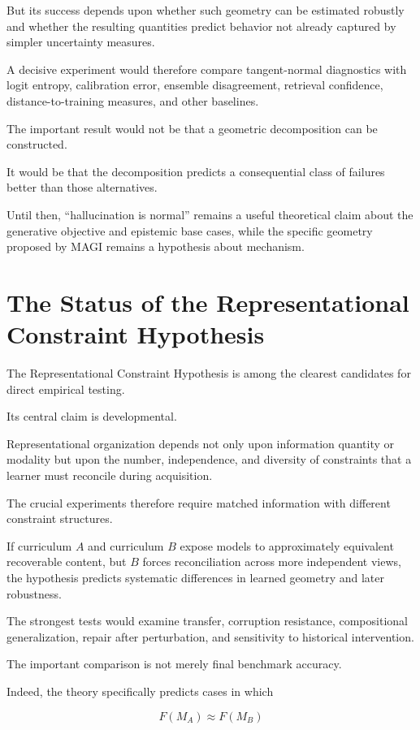 \documentclass[11pt]{article}
\theoremstyle{remark}
\newcommand{\MAGI}{\textsc{MAGI}}
\begin{document}
But its success depends upon whether such geometry can be estimated robustly
and whether the resulting quantities predict behavior not already captured by
simpler uncertainty measures.

A decisive experiment would therefore compare tangent-normal diagnostics with
logit entropy, calibration error, ensemble disagreement, retrieval confidence,
distance-to-training measures, and other baselines.

The important result would not be that a geometric decomposition can be
constructed.

It would be that the decomposition predicts a consequential class of failures
better than those alternatives.

Until then, ``hallucination is normal'' remains a useful theoretical claim about
the generative objective and epistemic base cases, while the specific geometry
proposed by \MAGI{} remains a hypothesis about mechanism.

\section{The Status of the Representational Constraint Hypothesis}

The Representational Constraint Hypothesis is among the clearest candidates for
direct empirical testing.

Its central claim is developmental.

Representational organization depends not only upon information quantity or
modality but upon the number, independence, and diversity of constraints that a
learner must reconcile during acquisition.

The crucial experiments therefore require matched information with different
constraint structures.

If curriculum $A$ and curriculum $B$ expose models to approximately equivalent
recoverable content, but $B$ forces reconciliation across more independent
views, the hypothesis predicts systematic differences in learned geometry and
later robustness.

The strongest tests would examine transfer, corruption resistance,
compositional generalization, repair after perturbation, and sensitivity to
historical intervention.

The important comparison is not merely final benchmark accuracy.

Indeed, the theory specifically predicts cases in which

\begin{equation}
F(M_A)\approx F(M_B)
\end{equation}
\end{document}
